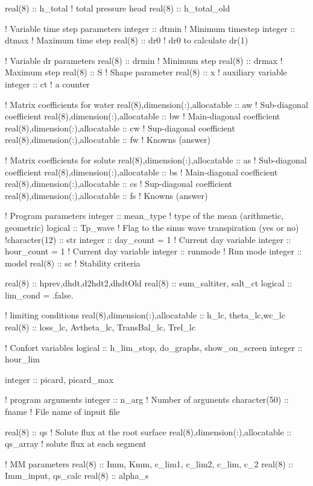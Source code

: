 real(8) :: h_total				! total pressure head
real(8) :: h_total_old

! Variable time step parameters
integer :: dtmin				! Minimum timestep
integer :: dtmax				! Maximum time step
real(8) :: dr0					! dr0 to calculate dr(1)

! Variable dr parameters
real(8) :: drmin				! Minimum step
real(8) :: drmax				! Maximum step
real(8) :: S					! Shape parameter
real(8) :: x					! auxiliary variable
integer :: ct					! a counter

! Matrix coefficients for water
real(8),dimension(:),allocatable :: aw	  	! Sub-diagonal coefficient 
real(8),dimension(:),allocatable :: bw	  	! Main-diagonal coefficient
real(8),dimension(:),allocatable :: cw     	! Sup-diagonal coefficient
real(8),dimension(:),allocatable :: fw     	! Knowns (answer)

! Matrix coefficients for solute
real(8),dimension(:),allocatable :: as		! Sub-diagonal coefficient
real(8),dimension(:),allocatable :: bs		! Main-diagonal coefficient
real(8),dimension(:),allocatable :: cs		! Sup-diagonal coefficient
real(8),dimension(:),allocatable :: fs		! Knowns (answer)

! Program parameters
integer :: mean_type				! type of the mean (arithmetic, geometric)
logical :: Tp_wave				! Flag to the sinus wave transpiration (yes or no)
!character(12) :: str
integer :: day_count = 1			! Current day variable
integer :: hour_count = 1			! Current day variable
integer :: runmode				! Run mode
integer :: model
real(8) :: sc					! Stability criteria

real(8) :: hprev,dhdt,d2hdt2,dhdtOld
real(8) :: sum_saltiter, salt_ct
logical :: lim_cond = .false.

! limiting conditions
real(8),dimension(:),allocatable :: h_lc, theta_lc,wc_lc
real(8) :: loss_lc, Avtheta_lc, TransBal_lc, Trel_lc

! Confort variables
logical :: h_lim_stop, do_graphs, show_on_screen
integer :: hour_lim

integer :: picard, picard_max

! program arguments
integer :: n_arg				! Number of argunents
character(50) :: fname				! File name of inpuit file

real(8) :: qs 					! Solute flux at the root surface
real(8),dimension(:),allocatable :: qs_array  	! solute flux at each segment

! MM parameters
real(8) :: Imm, Kmm, c_lim1, c_lim2, c_lim, c_2
real(8) :: Imm_input, qs_calc
real(8) :: alpha_s

